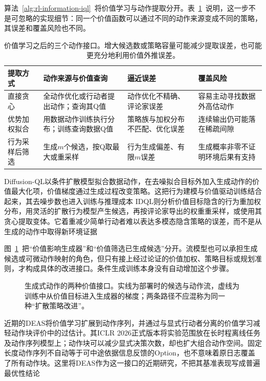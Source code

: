 算法~\ref{alg:rl-information-iql}~将价值学习与动作提取分开。表~\ref{tab:rl-information-extraction}~说明，这一步不是可忽略的实现细节：同一个价值函数可以通过不同的动作来源变成不同的策略，其误差和覆盖风险也不同。

\begin{table}[htbp]
  \centering
  \small
  \begin{tabularx}{\linewidth}{p{26mm}XXX}
    \toprule
    提取方式 & 动作来源与价值查询 & 逼近误差 & 覆盖风险 \\
    \midrule
    直接贪心 & 全动作优化或行动者提出动作；查询其Q值 & 动作优化不精确、评论家误差 & 容易主动寻找数据外高估动作 \\
    优势加权拟合 & 用数据动作训练执行分布；训练查询数据Q值 & 策略族与加权分布不匹配、优化误差 & 连续输出仍可能落在稀疏间隙 \\
    行为采样后筛选 & 生成$m$个候选，按Q取最大或重采样 & 行为生成偏差、有限$m$误差 & 生成概率非零不证明环境后果有支持 \\
    \bottomrule
  \end{tabularx}
  \caption{价值学习之后的三个动作接口。增大候选数或策略容量可能减少提取误差，也可能更充分地利用价值外推误差。}
  \label{tab:rl-information-extraction}
\end{table}

Diffusion-QL以条件扩散模型拟合数据动作，在去噪拟合目标外加入生成动作的价值最大化项，价值梯度通过生成过程改变策略。这把行为建模与价值驱动训练结合起来，其去噪步数也进入训练与推理成本
IDQL则分析价值目标隐含的行为重加权分布，用灵活的扩散行为模型产生候选，再按评论家导出的权重重采样，或使用其贪心提取变体。它着重减少简单行动者难以表达多模态隐含策略的误差，而不是从生成的动作中取得新环境证据

图~\ref{fig:rl-information-extraction}~把“价值影响生成器”和“价值筛选已生成候选”分开。流模型也可以承担生成候选或可微动作映射的角色，但只有接上经过论证的价值加权、策略目标或规划准则，才构成具体的改进接口。条件生成训练本身没有自动增加这个步骤。

\begin{figure}[htbp]
  \centering
  
  \caption{生成式动作的两种价值接口。实线为部署时的候选与动作流，虚线为训练中从价值目标进入生成器的梯度；两条路径不应混称为同一种“扩散策略改进”。}
  \label{fig:rl-information-extraction}
\end{figure}

近期的DEAS将价值学习扩展到动作序列，并通过与显式行动者分离的价值学习减轻动作块评价中的过估计。其ICLR 2026正式版本将实验范围放在长时程离线任务及动作序列模型上；动作块可以减少显式决策次数，却也扩大组合动作空间。固定长度动作序列不自动等于可中途依据信息反馈的Option，也不意味着原日志覆盖了所有动作块。这里将DEAS作为这一接口的近期研究，不把其基准表现写成普遍最优性结论


